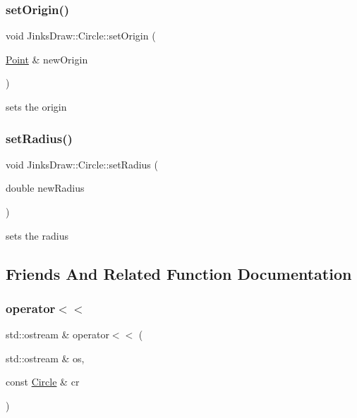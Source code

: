 \mbox{\label{class_jinks_draw_1_1_circle_a672cdc8d12a4f9667572bf069ec7988c}} 
\subsubsection{\texorpdfstring{set\+Origin()}{setOrigin()}}
{\footnotesize\ttfamily void Jinks\+Draw\+::\+Circle\+::set\+Origin (\begin{DoxyParamCaption}\item[{\mbox{\hyperlink{class_jinks_draw_1_1_point}{Point}} \&}]{new\+Origin }\end{DoxyParamCaption})}



sets the origin 

\mbox{\label{class_jinks_draw_1_1_circle_ae22a9e43bd368b4ed2fe4898e2439466}} 
\subsubsection{\texorpdfstring{set\+Radius()}{setRadius()}}
{\footnotesize\ttfamily void Jinks\+Draw\+::\+Circle\+::set\+Radius (\begin{DoxyParamCaption}\item[{double}]{new\+Radius }\end{DoxyParamCaption})}



sets the radius 



\subsection{Friends And Related Function Documentation}
\mbox{\label{class_jinks_draw_1_1_circle_acde181b779d97f3d80bc38d27e08c403}} 
\subsubsection{\texorpdfstring{operator$<$$<$}{operator<<}}
{\footnotesize\ttfamily std\+::ostream \& operator$<$$<$ (\begin{DoxyParamCaption}\item[{std\+::ostream \&}]{os,  }\item[{const \mbox{\hyperlink{class_jinks_draw_1_1_circle}{Circle}} \&}]{cr }\end{DoxyParamCaption})\hspace{0.3cm}{\ttfamily [friend]}}



